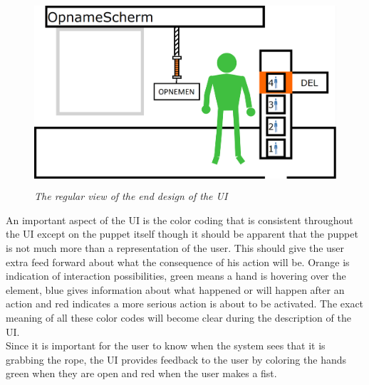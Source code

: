 \begin{figure}[H]
	\begin{center}
		\includegraphics[width=12.5cm, height=7cm]{figures/1_screen_with_user.png}
		\caption{\emph{The regular view of the end design of the UI}}
		\label{regular view end design}
	\end{center}
\end{figure}

An important aspect of the UI is the color coding that is consistent throughout the UI except on the puppet itself though it should be apparent that the puppet is not much more than a representation of the user. This should give the user extra feed forward about what the consequence of his action will be. Orange is indication of interaction possibilities, green means a hand is hovering over the element, blue gives information about what happened or will happen after an action and red indicates a more serious action is about to be activated. The exact meaning of all these color codes will become clear during the description of the UI.\\

Since it is important for the user to know when the system sees that it is grabbing the rope, the UI provides feedback to the user by coloring the hands green when they are open and red when the user makes a fist.\\

